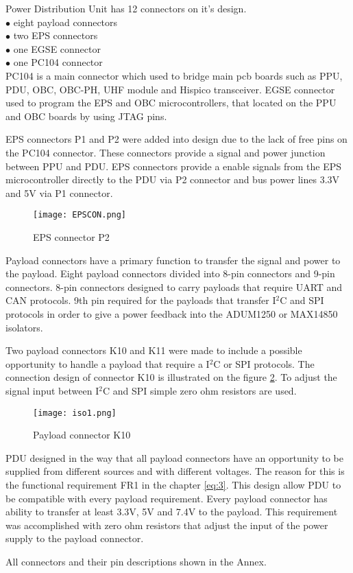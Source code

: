 Power Distribution Unit has 12 connectors on it's design. \\

$\bullet$ eight payload connectors\\
$\bullet$ two EPS connectors\\
$\bullet$ one EGSE connector\\
$\bullet$ one PC104 connector\\

PC104 is a main connector which used to bridge main pcb boards such as PPU, PDU, OBC, OBC-PH, UHF module and Hispico transceiver.
EGSE connector used to program the EPS and OBC microcontrollers, that located on the PPU and OBC boards by using JTAG pins.

EPS connectors P1 and P2 were added into design due to the lack of free pins on the PC104 connector. These connectors provide a signal and power junction between PPU and PDU. EPS connectors provide a enable signals from the EPS microcontroller directly to the PDU via P2 connector and bus power lines 3.3V and 5V via P1 connector.

  \begin{figure}[h]
  	\centering
  	\texttt{[image: EPSCON.png]}
  	\caption{EPS connector P2}
  	\label{fig: EPSCON}
  \end{figure} 

Payload connectors have a primary function to transfer the signal and power to the payload. Eight payload connectors divided into 8-pin connectors and 9-pin connectors. 8-pin connectors designed to carry payloads that require UART and CAN protocols. 9th pin required for the payloads that transfer I$^2$C and SPI protocols in order to give a power feedback into the ADUM1250 or MAX14850 isolators.  

Two payload connectors K10 and K11 were made to include a possible opportunity to handle a payload that require a I$^2$C or SPI protocols.
The connection design of connector K10 is illustrated on the figure \ref{fig: iso1}. To adjust the signal input between I$^2$C and SPI simple zero ohm resistors are used.

\begin{figure}[h]
	\centering
	\texttt{[image: iso1.png]}
	\caption{Payload connector K10}
	\label{fig: iso1}
\end{figure} 
 
PDU designed in the way that all payload connectors have an opportunity to be supplied from different sources and with different voltages. The reason for this is the functional requirement FR1 in the chapter \ref{eq:3}. This design allow PDU to be compatible with every payload requirement. Every payload connector has ability to transfer at least 3.3V, 5V and 7.4V to the payload. This requirement was accomplished with zero ohm  resistors that adjust the input of the power supply to the payload connector.

All connectors and their pin descriptions shown in the Annex. 

 
  
  